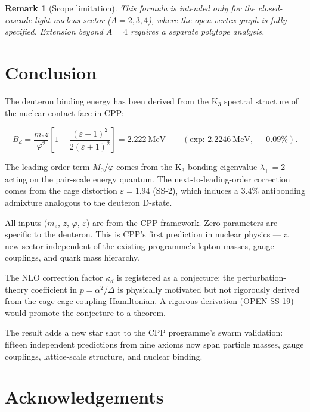 \documentclass[11pt,letterpaper]{article}
\newtheorem{remark}[theorem]{Remark}
\newcommand{\phig}{\varphi}
\newcommand{\Kthree}{\mathrm{K}_3}
\newcommand{\Mzero}{M_0}
\newcommand{\Bd}{B_d}
\newcommand{\epscage}{\varepsilon}
\newcommand{\kd}{\kappa_d}
\begin{document}
\begin{remark}[Scope limitation]
This formula is intended only for the closed-cascade
light-nucleus sector ($A = 2, 3, 4$), where the open-vertex
graph is fully specified.  Extension beyond $A = 4$ requires
a separate polytope analysis.
\end{remark}

\section{Conclusion}
\label{sec:conclusion}

The deuteron binding energy has been derived from the
$\Kthree$ spectral structure of the nuclear contact face
in CPP:

\begin{equation}
\Bd = \frac{m_e z}{\phig^2}
\left[1 - \frac{(\epscage-1)^2}{2(\epscage+1)^2}\right]
= 2.222~\text{MeV}
\qquad (\text{exp: } 2.2246~\text{MeV},~-0.09\%).
\end{equation}

The leading-order term $\Mzero/\phig$ comes from the
$\Kthree$ bonding eigenvalue $\lambda_+ = 2$ acting on the
pair-scale energy quantum.  The next-to-leading-order
correction comes from the cage distortion
$\epscage = 1.94$ (SS-2), which induces a $3.4\%$
antibonding admixture analogous to the deuteron D-state.

All inputs ($m_e$, $z$, $\phig$, $\epscage$) are from the
CPP framework.  Zero parameters are specific to the
deuteron.  This is CPP's first prediction in nuclear
physics --- a new sector independent of the existing
programme's lepton masses, gauge couplings, and quark mass
hierarchy.

The NLO correction factor $\kd$ is registered as a
conjecture: the perturbation-theory coefficient in
$p = \alpha^2/\Delta$ is physically motivated but not
rigorously derived from the cage-cage coupling Hamiltonian.
A rigorous derivation (OPEN-SS-19) would promote the
conjecture to a theorem.

The result adds a new star shot to the CPP programme's
swarm validation: fifteen independent predictions from
nine axioms now span particle masses, gauge couplings,
lattice-scale structure, and nuclear binding.

\section*{Acknowledgements}
\end{document}
